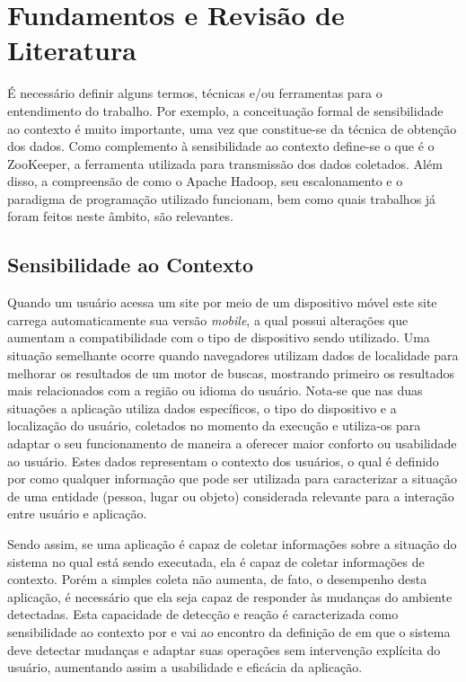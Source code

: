 \chapter{Fundamentos e Revisão de Literatura}
\label{chap:fundamentacao}
É necessário definir alguns termos, técnicas e/ou ferramentas para o entendimento do trabalho. Por exemplo, a conceituação formal de sensibilidade ao contexto é muito importante, uma vez que constitue-se da técnica de obtenção dos dados. Como complemento à sensibilidade ao contexto define-se o que é o ZooKeeper, a ferramenta utilizada para transmissão dos dados coletados. Além disso, a compreensão de como o Apache Hadoop, seu escalonamento e o paradigma de programação utilizado funcionam, bem como quais trabalhos já foram feitos neste âmbito, são relevantes.


\section{Sensibilidade ao Contexto}
\label{sec:ctx}
Quando um usuário acessa um site por meio de um dispositivo móvel este site carrega automaticamente sua versão \emph{mobile}, a qual possui alterações que aumentam a compatibilidade com o tipo de dispositivo sendo utilizado. Uma situação semelhante ocorre quando navegadores utilizam dados de localidade para melhorar os resultados de um motor de buscas, mostrando primeiro os resultados mais relacionados com a região ou idioma do usuário. Nota-se que nas duas situações a aplicação utiliza dados específicos, o tipo do dispositivo e a localização do usuário, coletados no momento da execução e utiliza-os para adaptar o seu funcionamento de maneira a oferecer maior conforto ou usabilidade ao usuário. Estes dados representam o contexto dos usuários, o qual é definido por \cite{Dey} como qualquer informação que pode ser utilizada para caracterizar a situação de uma entidade (pessoa, lugar ou objeto) considerada relevante para a interação entre usuário e aplicação.

Sendo assim, se uma aplicação é capaz de coletar informações sobre a situação do sistema no qual está sendo executada, ela é capaz de coletar informações de contexto. Porém a simples coleta não aumenta, de fato, o desempenho desta aplicação, é necessário que ela seja capaz de responder às mudanças do ambiente detectadas. Esta capacidade de detecção e reação é caracterizada como sensibilidade ao contexto por \cite{Maamar} e vai ao encontro da definição de \cite{Baldauf} em que o sistema deve detectar mudanças e adaptar suas operações sem intervenção explícita do usuário, aumentando assim a usabilidade e eficácia da aplicação.


